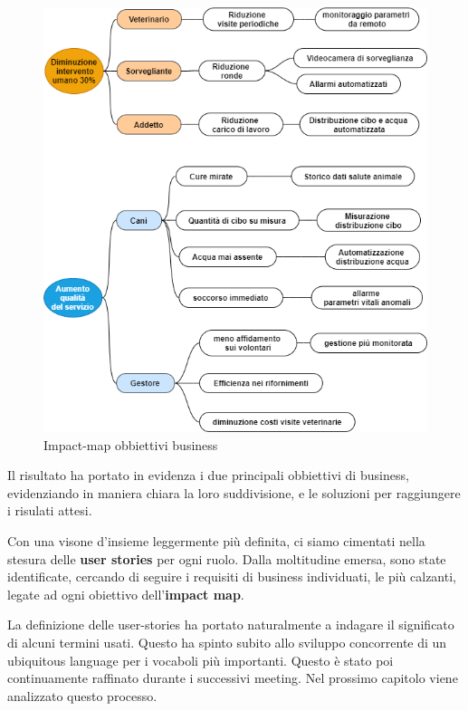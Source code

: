     \begin{figure}[H]
        \caption{Impact-map obbiettivi business}
        \centering
        \includegraphics[width=1\textwidth]{DrawIo/impactMap.png}
    \end{figure}

    Il risultato ha portato in evidenza i due principali obbiettivi di business, evidenziando in maniera chiara la loro suddivisione, e le soluzioni per raggiungere i risulati attesi.
    
    Con una visone d'insieme leggermente più definita, ci siamo cimentati nella stesura delle \textbf{user stories} per ogni ruolo. Dalla moltitudine emersa, sono state identificate, cercando di seguire i requisiti di business individuati,  le più calzanti, legate ad ogni obiettivo dell'\textbf{impact map}.

	La definizione delle user-stories ha portato naturalmente a indagare il significato di alcuni termini usati. Questo ha spinto subito allo sviluppo concorrente di un ubiquitous language per i vocaboli più importanti. Questo è stato poi continuamente raffinato durante i successivi meeting. 
	Nel prossimo capitolo viene analizzato questo processo. 
    
